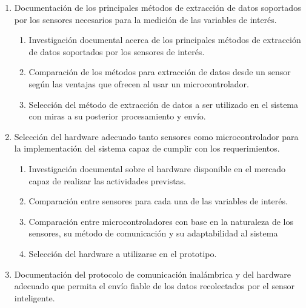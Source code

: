\documentclass[12pt,letterpaper]{article}
\begin{document}
\begin{enumerate}[1.]
	
	
	
	\item Documentación de los principales métodos de extracción de datos soportados por los
	sensores necesarios para la medición de las variables de interés.
	
		\begin{enumerate}
		
		\item Investigación documental acerca de los principales métodos de extracción de datos soportados por los sensores de interés. 
		
		\item Comparación de los métodos para extracción de datos desde un sensor según las ventajas que ofrecen al usar un microcontrolador.
		
		\item Selección del método de extracción de datos a ser utilizado en el sistema con miras a su posterior procesamiento y envío.
		
		
	\end{enumerate}
	
	\item  Selección del hardware adecuado tanto sensores como microcontrolador para la
	implementación del sistema capaz de cumplir con los requerimientos.
	
	
	\begin{enumerate}
		
		\item Investigación documental sobre el hardware disponible en el mercado capaz de realizar las actividades previstas.
		
		\item Comparación entre sensores para cada una de las variables de interés.
		
		\item Comparación entre microcontroladores con base en la naturaleza de los sensores, su método de comunicación y su adaptabilidad al sistema
		
		\item Selección del hardware a utilizarse en el prototipo.
		
		
		
	\end{enumerate}
	
	
	\item Documentación del protocolo de comunicación inalámbrica y del hardware adecuado que permita el envío fiable de los datos recolectados por el sensor
	inteligente.
	

\end{enumerate}
\end{document}
